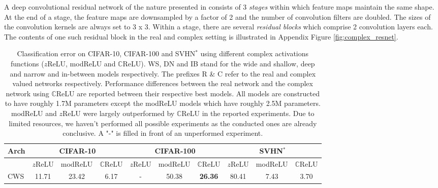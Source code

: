 \documentclass{article}
\begin{document}
A deep convolutional residual network of the nature presented in \cite{he2015deep,he2016identity} consists of 3 \textit{stages} within which feature maps maintain the same shape. At the end of a stage, the feature maps are downsampled by a factor of 2 and the number of convolution filters are doubled. The sizes of the convolution kernels are always set to 3 x 3. Within a stage, there are several \textit{residual blocks} which comprise 2 convolution layers each. The contents of one such residual block in the real and complex setting is illustrated in Appendix Figure \ref{fig:complex_resnet}.

\begin{table}[t]
\vskip 0.15in
\begin{center}
\caption{Classification error on CIFAR-10, CIFAR-100 and SVHN$^*$ using different complex activations functions ($z$ReLU, modReLU and $\mathbb{C}$ReLU). WS, DN and IB stand for the wide and shallow, deep and narrow and in-between models respectively. The prefixes R \& C refer to the real and complex valued networks respectively. Performance differences between the real network and the complex network using $\mathbb{C}$ReLU are reported between their respective best models. All models are constructed to have roughly 1.7M parameters except the modReLU models which have roughly 2.5M parameters. modReLU and $z$ReLU were largely outperformed by $\mathbb{C}$ReLU in the reported experiments. Due to  limited resources, we haven't performed all possible experiments as the conducted ones are already conclusive. A "-" is filled in front of an unperformed experiment.}
\label{results_activation}
\begin{small}
\begin{sc}
\begin{tabular}{l|ccc|ccc|ccc}
\toprule
Arch & \multicolumn{3}{c|}{CIFAR-10} & \multicolumn{3}{c|}{CIFAR-100} & \multicolumn{3}{c}{SVHN$^*$} \\
\midrule
& $z$ReLU & \hspace{-4mm} modReLU \hspace{-4mm} & $\mathbb{C}$ReLU & $z$ReLU & \hspace{-4mm} modReLU \hspace{-4mm} & $\mathbb{C}$ReLU & $z$ReLU & \hspace{-4mm} modReLU \hspace{-4mm} & $\mathbb{C}$ReLU\\
\midrule
CWS & 11.71 & 23.42 & 6.17 & - & 50.38 & \textbf{26.36} & 80.41 & 7.43 & 3.70 \\

\end{tabular}
\end{sc}
\end{small}
\end{center}
\end{table}
\end{document}
